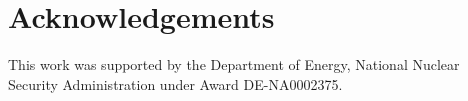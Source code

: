 \documentclass[review,3p]{elsarticle}
\begin{document}
\section{Acknowledgements}
This work was supported by the Department of Energy, National Nuclear Security Administration under Award DE-NA0002375.






\end{document}
